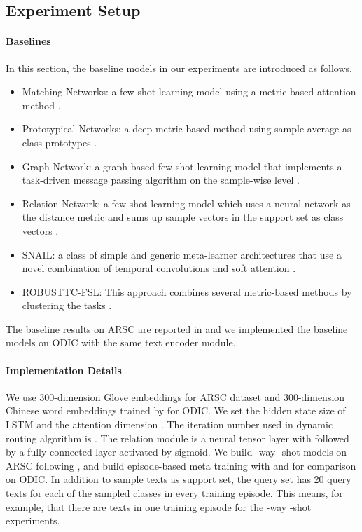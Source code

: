 \documentclass[11pt,a4paper]{article}
\begin{document}
\subsection{Experiment Setup}
\paragraph{Baselines} In this section, the baseline models in our experiments are introduced as follows.
\begin{itemize}
\item Matching Networks: a few-shot learning model using a metric-based attention method \citep{vinyals2016matching}. 
\item Prototypical Networks: a deep metric-based method using sample average as class prototypes \citep{snell2017prototypical}.
\item Graph Network: a graph-based few-shot learning model that implements a task-driven message passing algorithm on the sample-wise level \citep{Garcia2017FewShotLW}.
\item Relation Network: a few-shot learning model which uses a neural network as the distance metric and sums up sample vectors in the support set as class vectors \citep{sung2018learning}.
\item SNAIL: a class of simple and generic meta-learner architectures that use a novel combination of temporal convolutions and soft attention \citep{mishra2017simple}.
\item ROBUSTTC-FSL: This approach combines several metric-based methods by clustering the tasks \citep{yu2018diverse}.
\end{itemize}

The baseline results on ARSC are reported in \citet{yu2018diverse} and we implemented the baseline models on ODIC with the same text encoder module.


\paragraph{Implementation Details} We use 300-dimension Glove embeddings \citep{pennington2014glove} for ARSC dataset and 300-dimension Chinese word embeddings trained by \citet{li2018analogical} for ODIC. We set the hidden state size of LSTM  and the attention dimension . The iteration number  used in dynamic routing algorithm is . The relation module is a neural tensor layer with  followed by a fully connected layer activated by sigmoid. We build -way -shot models on ARSC following \citet{yu2018diverse}, and build episode-based meta training with  and  for comparison on ODIC. In addition to  sample texts as support set, the query set has 20 query texts for each of the  sampled classes in every training episode. This means, for example, that there are  texts in one training episode for the -way -shot experiments.
\end{document}
